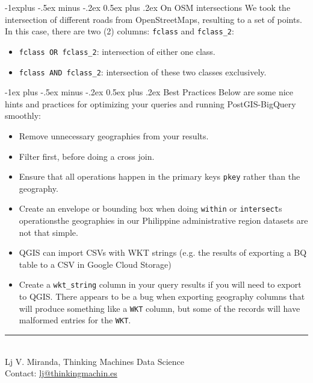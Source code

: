 \documentclass[10pt,landscape]{article}
\makeatletter
\renewcommand{\section}{\@startsection{section}{1}{0mm}%
                                {-1ex plus -.5ex minus -.2ex}%
                                {0.5ex plus .2ex}%
                                {\normalfont\large\bfseries}}
\renewcommand{\subsection}{\@startsection{subsection}{2}{0mm}%
                                {-1explus -.5ex minus -.2ex}%
                                {0.5ex plus .2ex}%
                                {\normalfont\normalsize\bfseries}}
\makeatother
\begin{document}
\begin{multicols}{3}
\subsection{On OSM intersections} We took the intersection of
different roads from OpenStreetMaps, resulting to a set of points. In this
case, there are two (2) columns: \texttt{fclass} and \texttt{fclass\_2}:

\begin{itemize}
    \item \texttt{fclass OR fclass\_2}: intersection of either one class. 
    \item \texttt{fclass AND fclass\_2}: intersection of these two classes
        exclusively.
\end{itemize}


\section{Best Practices}
Below are some nice hints and practices for optimizing your queries and running
PostGIS-BigQuery smoothly:

\begin{itemize}
    \item Remove unnecessary geographies from your results.
    \item Filter first, before doing a cross join.
    \item Ensure that all operations happen in the primary keys \texttt{pkey}
        rather than the geography.
    \item Create an envelope or bounding box when doing \texttt{within} or
        \texttt{intersect}s operations\textemdash the geographies in our
        Philippine administrative region datasets are not that simple. 
    \item QGIS can import CSVs with WKT strings (e.g. the results of exporting
        a BQ table to a CSV in Google Cloud Storage)
    \item Create a \texttt{wkt\_string} column in your query results if you
        will need to export to QGIS. There appears to be a bug when exporting
        geography columns that will produce something like a \texttt{WKT}
        column, but some of the records will have malformed entries for the
        \texttt{WKT}. 
\end{itemize}


\nocite{*}


    
\vfill
\hrule
~\\
Lj V. Miranda, Thinking Machines Data Science\\
Contact: \href{mailto:lj@thinkingmachin.es}{lj@thinkingmachin.es}
\end{multicols}
\end{document}

